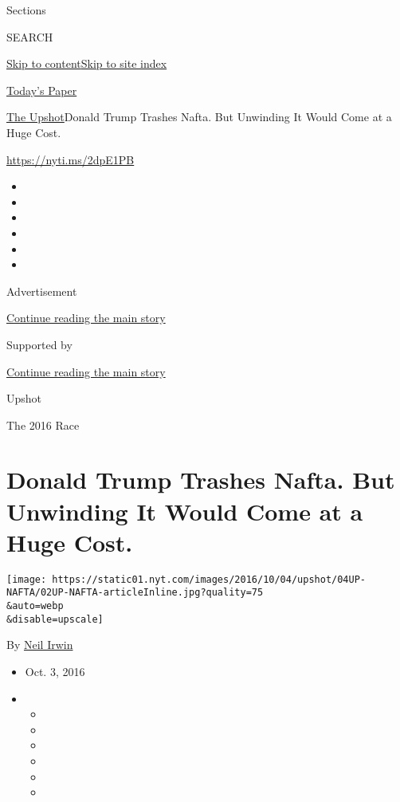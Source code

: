 Sections

SEARCH

\protect\hyperlink{site-content}{Skip to
content}\protect\hyperlink{site-index}{Skip to site index}

\href{https://myaccount.nytimes.com/auth/login?response_type=cookie\&client_id=vi}{}

\href{https://www.nytimes.com/section/todayspaper}{Today's Paper}

\href{/section/upshot}{The Upshot}\textbar{}Donald Trump Trashes Nafta.
But Unwinding It Would Come at a Huge Cost.

\url{https://nyti.ms/2dpE1PB}

\begin{itemize}
\item
\item
\item
\item
\item
\item
\end{itemize}

Advertisement

\protect\hyperlink{after-top}{Continue reading the main story}

Supported by

\protect\hyperlink{after-sponsor}{Continue reading the main story}

Upshot

The 2016 Race

\hypertarget{donald-trump-trashes-nafta-but-unwinding-it-would-come-at-a-huge-cost}{%
\section{Donald Trump Trashes Nafta. But Unwinding It Would Come at a
Huge
Cost.}\label{donald-trump-trashes-nafta-but-unwinding-it-would-come-at-a-huge-cost}}

\texttt{[image: https://static01.nyt.com/images/2016/10/04/upshot/04UP-NAFTA/02UP-NAFTA-articleInline.jpg?quality=75\\\&auto=webp\\\&disable=upscale]}

By \href{http://www.nytimes.com/by/neil-irwin}{Neil Irwin}

\begin{itemize}
\item
  Oct. 3, 2016
\item
  \begin{itemize}
  \item
  \item
  \item
  \item
  \item
  \item
  \end{itemize}
\end{itemize}

